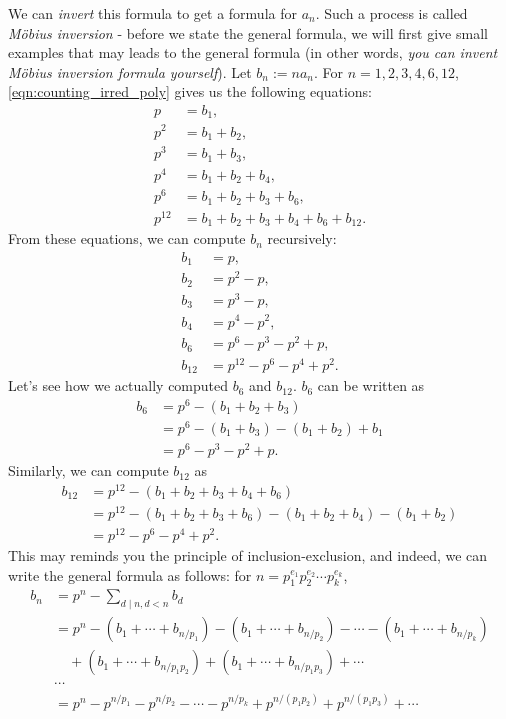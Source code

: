 We can \emph{invert} this formula to get a formula for $a_n$.
Such a process is called \emph{M\"obius inversion} - before we state the general formula, we will first give small examples that may leads to the general formula (in other words, \emph{you can invent M\"obius inversion formula yourself}).
Let $b_n := n a_n$.
For $n = 1, 2, 3, 4, 6, 12$, \eqref{eqn:counting_irred_poly} gives us the following equations:
\begin{align*}
    p &= b_1,\\
    p^2 &= b_1 + b_2,\\
    p^3 &= b_1 + b_3,\\
    p^4 &= b_1 + b_2 + b_4,\\
    p^6 &= b_1 + b_2 + b_3 + b_6, \\
    p^{12} &= b_1 + b_2 + b_3 + b_4 + b_6 + b_{12}.
\end{align*}
From these equations, we can compute $b_n$ recursively:
\begin{align*}
    b_1 &= p,\\
    b_2 &= p^2 - p,\\
    b_3 &= p^3 - p,\\
    b_4 &= p^4 - p^2,\\
    b_6 &= p^6 - p^3 - p^2 + p,\\
    b_{12} &= p^{12} - p^6 - p^4 + p^2.
\end{align*}
Let's see how we actually computed $b_6$ and $b_{12}$. $b_{6}$ can be written as
\begin{align*}
    b_6 &= p^6 - (b_1 + b_2 + b_3)\\
        &= p^6 - (b_1 + b_3) - (b_1 + b_2) + b_1\\
        &= p^6 - p^3 - p^2 + p.
\end{align*}
Similarly, we can compute $b_{12}$ as
\begin{align*}
    b_{12} &= p^{12} - (b_1 + b_2 + b_3 + b_4 + b_6)\\
        &= p^{12} - (b_1 + b_2 + b_3 + b_6) - (b_1 + b_2 + b_4) - (b_1 + b_2)\\
        &= p^{12} - p^6 - p^4 + p^2.
\end{align*}
This may reminds you the principle of inclusion-exclusion, and indeed, we can write the general formula as follows: for $n = p_1^{e_1} p_2^{e_2} \cdots p_k^{e_k}$,
\begin{align*}
    b_{n} &= p^n - \sum_{d \mid n, d < n} b_d\\
        &= p^n - (b_1 + \cdots + b_{n / p_1}) - (b_1 + \cdots + b_{n / p_2}) - \cdots - (b_1 + \cdots + b_{n / p_k}) \\
        &\quad + (b_1 + \cdots + b_{n / p_1 p_2}) + (b_1 + \cdots + b_{n / p_1 p_3}) + \cdots\\
        &\cdots\\
        &= p^n - p^{n / p_1} - p^{n / p_2} - \cdots - p^{n / p_k} + p^{n / (p_1 p_2)} + p^{n / (p_1 p_3)} + \cdots\\
\end{align*}

